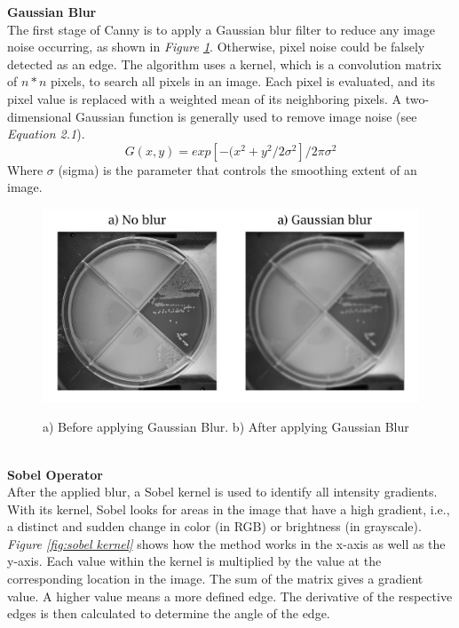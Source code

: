 \noindent \textbf{Gaussian Blur}\\
The first stage of Canny is to apply a Gaussian blur filter to reduce any image noise occurring, as shown in \textit{Figure \ref{fig:gaussian blur}}. Otherwise, pixel noise could be falsely detected as an edge. The algorithm uses a kernel, which is a convolution matrix of $n*n$ pixels, to search all pixels in an image. Each pixel is evaluated, and its pixel value is replaced with a weighted mean of its neighboring pixels. A two-dimensional Gaussian function is generally used to remove image noise (see \textit{Equation 2.1}). \begin{equation} G(x,y)=exp[-(x^2+y^2/2\sigma^2]/2\pi\sigma^2\end{equation} Where $\sigma$ (sigma) is the parameter that controls the smoothing extent of an image. 

\begin{figure}[H]
        \centering
        \includegraphics[width=.7\linewidth]{figures/PDF/Gaussian_blur.pdf}\\
        \caption{a) Before applying Gaussian Blur. b) After applying Gaussian Blur}
        \label{fig:gaussian blur}
\end{figure}\\

\noindent \textbf{Sobel Operator}\\
\noindent After the applied blur, a Sobel kernel is used to identify all intensity gradients. With its kernel, Sobel looks for areas in the image that have a high gradient, i.e., a distinct and sudden change in color (in RGB) or brightness (in grayscale). \textit{Figure \ref{fig:sobel kernel}} shows how the method works in the x-axis as well as the y-axis. Each value within the kernel is multiplied by the value at the corresponding location in the image. The sum of the matrix gives a gradient value. A higher value means a more defined edge. The derivative of the respective edges is then calculated to determine the angle of the edge.\\

